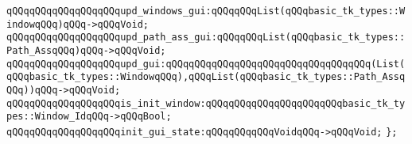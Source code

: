 \verb|qQQqqQQqqQQqqQQqqQQqupd_windows_gui:qQQqqQQqList(qQQqbasic_tk_types::WindowqQQq)qQQq->qQQqVoid;|\newline
\verb|qQQqqQQqqQQqqQQqqQQqupd_path_ass_gui:qQQqqQQqList(qQQqbasic_tk_types::Path_AssqQQq)qQQq->qQQqVoid;|\newline
\verb|qQQqqQQqqQQqqQQqqQQqupd_gui:qQQqqQQqqQQqqQQqqQQqqQQqqQQqqQQqqQQq(List(qQQqbasic_tk_types::WindowqQQq),qQQqList(qQQqbasic_tk_types::Path_AssqQQq))qQQq->qQQqVoid;|\newline
\verb|qQQqqQQqqQQqqQQqqQQqis_init_window:qQQqqQQqqQQqqQQqqQQqqQQqbasic_tk_types::Window_IdqQQq->qQQqBool;|\newline
\verb|qQQqqQQqqQQqqQQqqQQqinit_gui_state:qQQqqQQqqQQqVoidqQQq->qQQqVoid;|\newline
\newline
\verb|};|\newline

